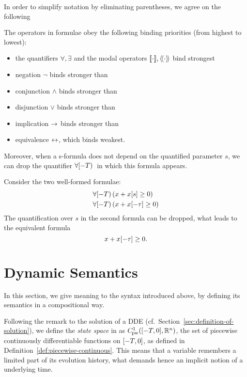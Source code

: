     In order to simplify notation by eliminating parentheses, we agree on the following
    \begin{convention}
        The operators in \ddL formulae obey the following binding priorities (from highest to lowest):
        \begin{itemize}
            \item the quantifiers $\forall,\exists$ and the modal operators $\dbox{\cdot}{},\ddiamond{\cdot}{}$ bind strongest
            \item negation $\lnot$ binds stronger than
            \item conjunction $\land$ binds stronger than 
            \item disjunction $\lor$ binds stronger than
            \item implication $\rightarrow$ binds stronger than
            \item equivalence $\leftrightarrow$, which binds weakest.
        \end{itemize}
    \end{convention}

    Moreover, when a s-formula does not depend on the quantified parameter $s$, we can drop the quantifier $\forall [-T){\,}$ in which this formula appears.

    \begin{example}
        Consider the two well-formed \ddL formulae:
        \begin{align*}
            &\forall [-T){\,} (x+x[s]\geq 0)\\
            &\forall [-T){\,} (x+x[-\tau]\geq 0) 
        \end{align*}
        The quantification over $s$ in the second formula can be dropped, what leads to the equivalent formula
        \begin{equation*}
            x+x[-\tau]\geq 0.
        \end{equation*}
    \end{example}


\section{Dynamic Semantics}
    \label{sec:dynamic-semantics}


    In this section, we give meaning to the syntax introduced above, by defining its semantics in a compositional way.

    Following the remark to the solution of a DDE (cf.\ Section~\ref{sec:definition-of-solution}), we define the \emph{state space} in \ddL as $\statespace$, the set of piecewise continuously differentiable functions on $[-T,0]$, as defined in Definition~\ref{def:piecewise-continuous}.
    This means that a variable remembers a limited part of its evolution history, what demands hence an implicit notion of a underlying time.

